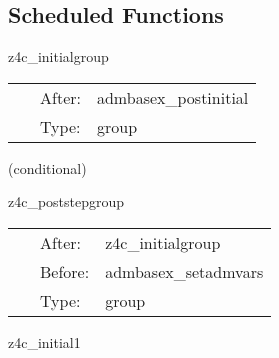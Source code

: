 \subsection*{Scheduled Functions}
\vspace{5mm}


\hspace{5mm} z4c\_initialgroup 

\hspace{5mm}{\it convert adm to z4c variables } 


\hspace{5mm}

 \begin{tabular*}{160mm}{cll} 
~ & After:  & admbasex\_postinitial \\ 
~ & Type:  & group \\ 
\end{tabular*} 


\vspace{5mm}

   (conditional) 

\hspace{5mm} z4c\_poststepgroup 

\hspace{5mm}{\it post-process z4c variables } 


\hspace{5mm}

 \begin{tabular*}{160mm}{cll} 
~ & After:  & z4c\_initialgroup \\ 
~ & Before:  & admbasex\_setadmvars \\ 
~ & Type:  & group \\ 
\end{tabular*} 


\vspace{5mm}


\hspace{5mm} z4c\_initial1 

\hspace{5mm}{\it convert adm to z4c variables, part 1 } 


\hspace{5mm}

